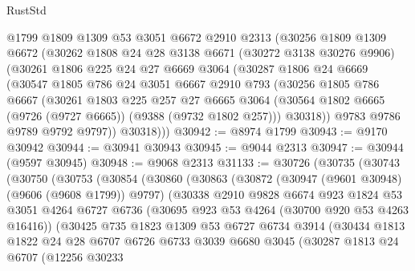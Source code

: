 \begin{lexlean}{RustStd}
\begin{coremodule}
    @1799
    @1809
    @1309
    @53
    @3051
    @6672
    @2910
    @2313
    (@30256
      @1809
      @1309
      @6672
      (@30262
        @1808
        @24
        @28
        @3138
        @6671
        (@30272 @3138 @30276 @9906)
        (@30261
          @1806
          @225
          @24
          @27
          @6669
          @3064
          (@30287
            @1806
            @24
            @6669
            (@30547
              @1805
              @786
              @24
              @3051
              @6667
              @2910
              @793
              (@30256
                @1805
                @786
                @6667
                (@30261
                  @1803
                  @225
                  @257
                  @27
                  @6665
                  @3064
                  (@30564 @1802 @6665 (@9726 (@9727 @6665)) (@9388 (@9732 @1802 @257)))
                  @30318))
              @9783
              @9786
              @9789
              @9792
              @9797))
          @30318)))
@30942 := @8974 @1799
@30943 := @9170 @30942
@30944 := @30941 @30943
@30945 := @9044 @2313
@30947 := @30944 (@9597 @30945)
@30948 := @9068 @2313
@31133 := @30726
    (@30735
      (@30743
        (@30750
          (@30753
            (@30854
              (@30860
                (@30863
                  (@30872
                    (@30947 (@9601 @30948) (@9606 (@9608 @1799)) @9797)
                    (@30338
                      @2910
                      @9828
                      @6674
                      @923
                      @1824
                      @53
                      @3051
                      @4264
                      @6727
                      @6736
                      (@30695 @923 @53 @4264 (@30700 @920 @53 @4263 @16416))
                      (@30425
                        @735
                        @1823
                        @1309
                        @53
                        @6727
                        @6734
                        @3914
                        (@30434
                          @1813
                          @1822
                          @24
                          @28
                          @6707
                          @6726
                          @6733
                          @3039
                          @6680
                          @3045
                          (@30287
                            @1813
                            @24
                            @6707
                            (@12256
                              @30233

\end{coremodule}
\end{lexlean}
